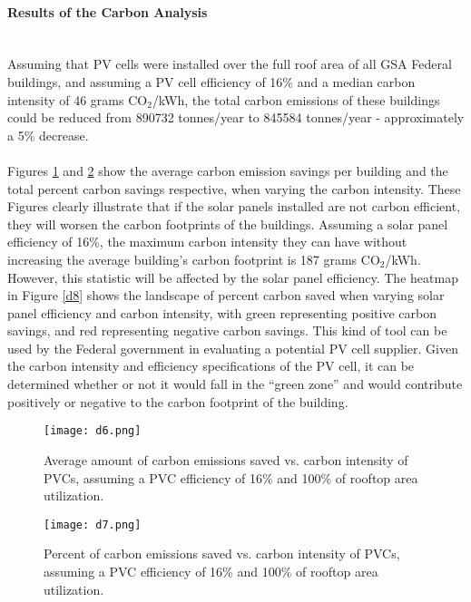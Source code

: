 \paragraph{Results of the Carbon Analysis} \mbox{ }\\
Assuming that PV cells were installed over the full roof area of all GSA Federal buildings, and assuming a PV cell efficiency of 16\% and a median carbon intensity of 46 grams CO$_{2}$/kWh, the total carbon emissions of these buildings could be reduced from 890732 tonnes/year to 845584 tonnes/year - approximately a 5\% decrease.
\\\\
\noindent Figures \ref{d6} and \ref{d7} show the average carbon emission savings per building and the total percent carbon savings respective, when varying the carbon intensity. These Figures clearly illustrate that if the solar panels installed are not carbon efficient, they will worsen the carbon footprints of the buildings. Assuming a solar panel efficiency of 16\%, the maximum carbon intensity they can have without increasing the average building's carbon footprint is 187 grams CO$_{2}$/kWh. However, this statistic will be affected by the solar panel efficiency. The heatmap in Figure \ref{d8} shows the landscape of percent carbon saved when varying solar panel efficiency and carbon intensity, with green representing positive carbon savings, and red representing negative carbon savings. This kind of tool can be used by the Federal government in evaluating a potential PV cell supplier. Given the carbon intensity and efficiency specifications of the PV cell, it can be determined whether or not it would fall in the ``green zone'' and would contribute positively or negative to the carbon footprint of the building.

\begin{figure}
\begin{center}
\texttt{[image: d6.png]}
\caption{Average amount of carbon emissions saved vs. carbon intensity of PVCs, assuming a PVC efficiency of 16\% and 100\% of rooftop area utilization.}
\label{d6}
\end{center}
\end{figure}


\begin{figure}
\begin{center}
\texttt{[image: d7.png]}
\caption{Percent of carbon emissions saved vs. carbon intensity of PVCs, assuming a PVC efficiency of 16\% and 100\% of rooftop area utilization.}
\label{d7}
\end{center}
\end{figure}


